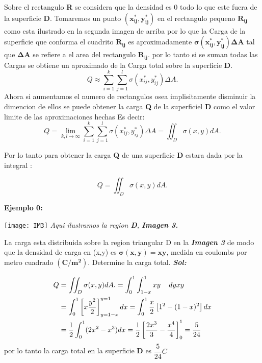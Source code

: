 \documentclass{article}
\begin{document}
\begin{flushleft}
Sobre el rectangulo \textbf{R} se considera que la densidad es 0 todo lo que este fuera de la superficie \textbf{D}. Tomaremos un punto $\mathbf{(x^{*}_{ij},y^{*}_{ij})}$ en el rectangulo pequeno $\mathbf{R_{ij}}$ como esta ilustrado en la segunda imagen de arriba	por lo que la Carga de la superficie que conforma el cuadrito $\mathbf{R_{ij}}$ es aproximadamente $\mathbf{\sigma(x^{*}_{ij},y^{*}_{ij})\Delta A}$ tal que $\mathbf{\Delta A}$ se refiere a el area del rectangulo $\mathbf{R_{ij}}$.
por lo tanto si se suman todas las Cargas se obtiene un aproximado de la Carga total sobre la superficie \textbf{D}.
\[Q\approx\sum_{i=1}^{k}\sum_{j=1}^{l}\sigma(x^{*}_{ij},y^{*}_{ij})\Delta A. \]
Ahora si aumentamos el numero de rectangulos osea implisitamente disminuir la dimencion de ellos se puede obtener la carga \textbf{Q} de la superficiel \textbf{D} como el valor limite de las aproximaciones hechas
\newline
Es decir:
\[Q = \lim_{k,l \to \infty}\sum_{i=1}^{k}\sum_{j=1}^{l}\sigma(x^{*}_{ij},y^{*}_{ij})\Delta A = \iint_{D}\sigma(x,y)dA. \]

Por lo tanto para obtener la carga \textbf{Q} de una superficie \textbf{D} estara dada por la integral :

\[Q =\iint_{D}\sigma(x,y)dA.\]

\textbf{\newline Ejemplo 0:}
\newline
\newline
\begin{center}
\texttt{[image: IM3]} \newline
\emph{Aqui ilustramos la region \textbf{D}, \textbf{\emph{Imagen 3.}}}
\end{center}
La carga esta distribuida sobre la region triangular D en la \textbf{\emph{Imagen 3}} de modo que la densidad de carga en (x,y) es $\mathbf{\sigma(x,y)=xy}$, medida en coulombs por metro cuadrado $\mathbf{(C/m^{2})}$. Determine la carga total. 
\newline
\newline
\newpage
\textbf{\emph{Sol:}}

 
 \[ 
\begin{split}
Q &=\iint_{D}\sigma(x,y)dA. = \int^{1}_{0}\int_{1-x}^{1}xy \hspace{4mm} dy xy\\
 &=\int_{0}^{1} \left[x\dfrac{y^{2}}{2}\right]_{y=1-x}^{y=1} dx = \int_{0}^{1}\dfrac{x}{2}\left[1^{2}-(1-x)^{2}\right]dx\\
 &=\dfrac{1}{2}\int_{0}^{1}(2x^{2}-x^{3})dx = \dfrac{1}{2}\left[\dfrac{2x^{3}}{3}-\dfrac{x^{4}}{4}\right]_{0}^{1}=\dfrac{5}{24}
\end{split}
\]
por lo tanto la carga total en la superficie \textbf{D} es ${\dfrac{5}{24}C}$
\end{flushleft}
\end{document}
